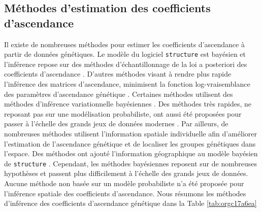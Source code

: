 \documentclass[12pt,a4paper,twoside]{ugathesis}
\begin{document}
\subsection{Méthodes d'estimation des coefficients d'ascendance}
\label{sec:orgb3901bf}

Il existe de nombreuses méthodes pour estimer les coefficients d'ascendance à
partir de données génétiques. Le modèle du logiciel \texttt{structure} est bayésien et
l'inférence repose sur des méthodes d'échantillonnage de la loi a posteriori des
coefficients d'ascendance \citep{Pritchard2000}. D'autres méthodes visant à rendre
plus rapide l'inférence des matrices d'ascendance, minimisent la fonction
log-vraisemblance des paramètres d'ascendance génétique
\citep{Tang_2005,alexander2009admixture}. Certaines méthodes utilisent des
méthodes d'inférence variationnelle bayésiennes \citep{Raj_2014}. Des méthodes
très rapides, ne reposant pas sur une modélisation probabiliste, ont aussi été
proposées pour passer à l'échelle des grands jeux de données modernes
\citep{Frichot_2014,Popescu_2014}. Par ailleurs, de nombreuses méthodes utilisent
l'information spatiale individuelle afin d'améliorer l'estimation de
l'ascendance génétique et de localiser les groupes génétiques dans l'espace.
Des méthodes ont ajouté l'information géographique au modèle bayésien de
\texttt{structure} \citep{CHEN_2007,Corander2008,GUEDJ_2011}. Cependant, les méthodes
bayésiennes reposent sur de nombreuses hypothèses et passent plus difficilement
à l'échelle des grands jeux de données. Aucune méthode non basée sur un modèle
probabiliste n'a été proposée pour l'inférence spatiale des coefficients
d'ascendance. Nous résumons les méthodes d'inférence des coefficients
d'ascendance génétique dans la Table \ref{tab:orgc17a6ea}
\end{document}
